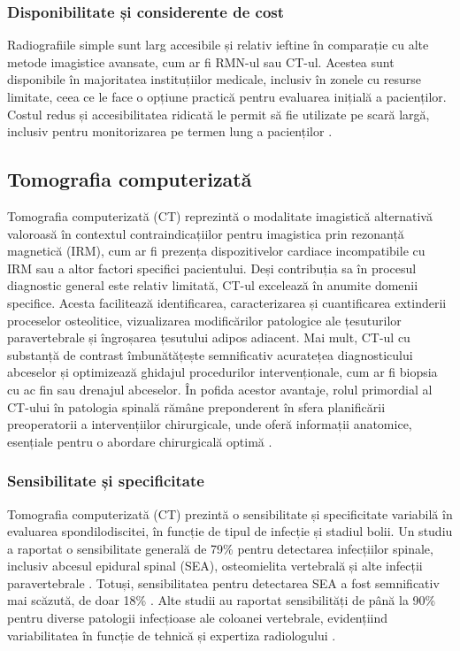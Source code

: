 \documentclass[romanian,12pt,a4paper]{article}
\begin{document}
\subsubsection{Disponibilitate și considerente de cost}

Radiografiile simple sunt larg accesibile și relativ ieftine în
comparație cu alte metode imagistice avansate, cum ar fi RMN-ul sau
CT-ul. Acestea sunt disponibile în majoritatea instituțiilor medicale,
inclusiv în zonele cu resurse limitate, ceea ce le face o opțiune
practică pentru evaluarea inițială a pacienților. Costul redus și
accesibilitatea ridicată le permit să fie utilizate pe scară largă,
inclusiv pentru monitorizarea pe termen lung a pacienților
\cite{ImagingSpondylodiscitisComprehensive2024}.

\subsection{Tomografia computerizată}

Tomografia computerizată (CT) reprezintă o modalitate imagistică
alternativă valoroasă în contextul contraindicațiilor pentru imagistica
prin rezonanță magnetică (IRM), cum ar fi prezența dispozitivelor
cardiace incompatibile cu IRM sau a altor factori specifici pacientului.
Deși contribuția sa în procesul diagnostic general este relativ
limitată, CT-ul excelează în anumite domenii specifice. Acesta
facilitează identificarea, caracterizarea și cuantificarea extinderii
proceselor osteolitice, vizualizarea modificărilor patologice ale
țesuturilor paravertebrale și îngroșarea țesutului adipos adiacent. Mai
mult, CT-ul cu substanță de contrast îmbunătățește semnificativ
acuratețea diagnosticului abceselor și optimizează ghidajul procedurilor
intervenționale, cum ar fi biopsia cu ac fin sau drenajul abceselor. În
pofida acestor avantaje, rolul primordial al CT-ului în patologia
spinală rămâne preponderent în sfera planificării preoperatorii a
intervențiilor chirurgicale, unde oferă informații anatomice, esențiale
pentru o abordare chirurgicală optimă
\cite{DiagnosticInterventionalManagement2020}.

\subsubsection{Sensibilitate și specificitate}

Tomografia computerizată (CT) prezintă o sensibilitate și specificitate
variabilă în evaluarea spondilodiscitei, în funcție de tipul de infecție
și stadiul bolii. Un studiu a raportat o sensibilitate generală de 79\%
pentru detectarea infecțiilor spinale, inclusiv abcesul epidural spinal
(SEA), osteomielita vertebrală și alte infecții paravertebrale
\cite{ImagingCharacteristicsCT2022}. Totuși, sensibilitatea pentru
detectarea SEA a fost semnificativ mai scăzută, de doar 18\%
\cite{ImagingCharacteristicsCT2022}. Alte studii au raportat
sensibilități de până la 90\% pentru diverse patologii infecțioase ale
coloanei vertebrale, evidențiind variabilitatea în funcție de tehnică și
expertiza radiologului \cite{ImagingAssessmentSpine2024}.
\end{document}
